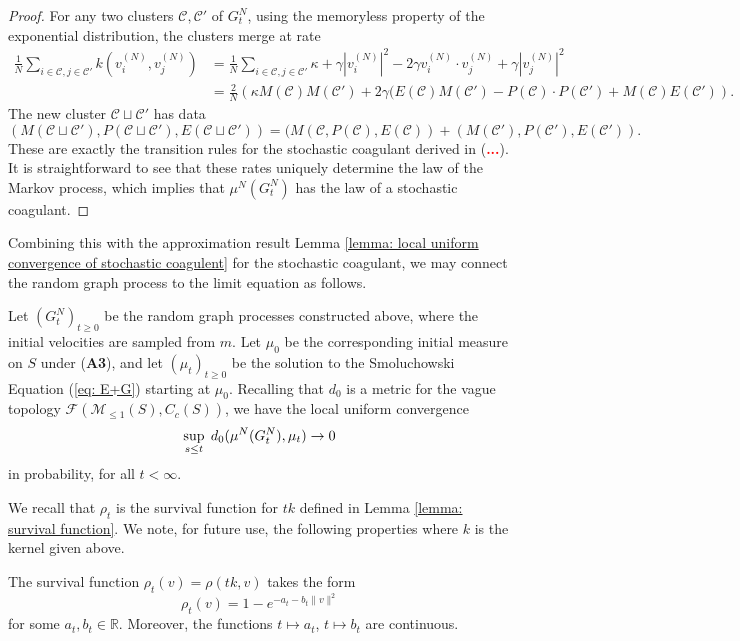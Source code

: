 \begin{proof} For any two clusters $\mathcal{C}, \mathcal{C}'$ of $G^N_t$, using the memoryless property of the exponential distribution, the clusters merge at rate \begin{equation} \begin{split}
    \frac{1}{N}\sum_{i \in \mathcal{C}, j \in \mathcal{C}'} k(v^{(N)}_i, v^{(N)}_j)& = \frac{1}{N}\sum_{i\in \mathcal{C}, j \in \mathcal{C}'} \kappa+\gamma|v^{(N)}_i|^2-2\gamma v^{(N)}_i \cdot v^{(N)}_j + \gamma|v^{(N)}_j|^2 \\ &= \frac{2}{N}\left(\kappa M(\mathcal{C})M(\mathcal{C}') +2\gamma (E(\mathcal{C})M(\mathcal{C}')-P(\mathcal{C})\cdot P(\mathcal{C}')+M(\mathcal{C}) E(\mathcal{C}')\right).
\end{split} \end{equation} The new cluster $\mathcal{C}\sqcup \mathcal{C}'$ has data \begin{equation}
    (M(\mathcal{C}\sqcup \mathcal{C}'), P(\mathcal{C}\sqcup \mathcal{C}'),E(\mathcal{C}\sqcup \mathcal{C}'))=(M(\mathcal{C},P(\mathcal{C}), E(\mathcal{C}))+(M(\mathcal{C}'),P(\mathcal{C}'), E(\mathcal{C}')).
\end{equation}These are exactly the transition rules for the stochastic coagulant derived in (\textcolor{red}{\textbf{...}}). It is straightforward to see that these rates uniquely determine the law of the Markov process, which implies that $\mu^N(G^N_t)$ has the law of a stochastic coagulant. \end{proof} Combining this with the approximation result Lemma \ref{lemma: local uniform convergence of stochastic coagulent} for the stochastic coagulant, we may connect the random graph process to the limit equation as follows. \begin{lemma}\label{lemma: convergence of random graphs} Let $(G^N_t)_{t\ge 0}$ be the random graph processes constructed above, where the initial velocities are sampled from $m$. Let $\mu_0$ be the corresponding initial measure on $S$ under (\textbf{A3}), and let $(\mu_t)_{t\ge 0}$ be the solution to the Smoluchowski Equation (\ref{eq: E+G}) starting at $\mu_0$. Recalling that $d_0$ is a metric for the vague topology $\mathcal{F}(\mathcal{M}_{\le 1}(S), C_c(S))$, we have the local uniform convergence \begin{equation}\sup_{s\le t} \hspace{0.1cm}d_0(\mu^N(G^N_t), \mu_t) \rightarrow 0 \end{equation} in probability, for all $t<\infty.$ \end{lemma} We recall that $\rho_t$ is the survival function for $tk$ defined in Lemma \ref{lemma: survival function}. We note, for future use, the following properties where $k$ is the kernel given above.
\begin{lemma}\label{lemma: form of rho-t}
    The survival function $\rho_t(v)=\rho(tk,v)$ takes the form \begin{equation}
        \rho_t(v)=1-e^{-a_t-b_t\|v\|^2}
    \end{equation} for some $a_t, b_t \in \mathbb{R}$. Moreover, the functions $t\mapsto a_t$, $t\mapsto b_t$ are continuous. 
\end{lemma}
